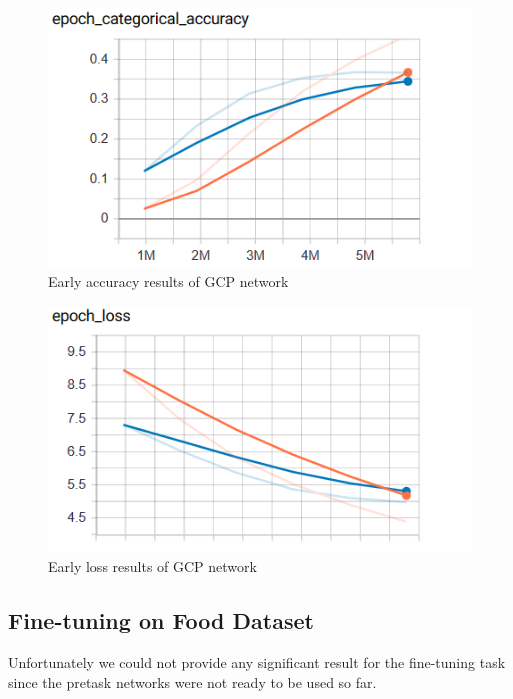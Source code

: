 \begin{figure}[!ht]
    \centering
    \includegraphics[scale=0.60]{images/GCP_early_accuracy.png}
    \caption{Early accuracy results of GCP network}
    \label{fig:early_GCP_acc}
\end{figure}
\begin{figure}[!ht]
    \centering
    \includegraphics[scale=0.60]{images/GCP_early_loss.png}
    \caption{Early loss results of GCP network}
    \label{fig:early_GCP_loss}
\end{figure}



\subsection{Fine-tuning on Food Dataset}
Unfortunately we could not provide any significant result for the fine-tuning task since the pretask networks were not ready to be used so far.


